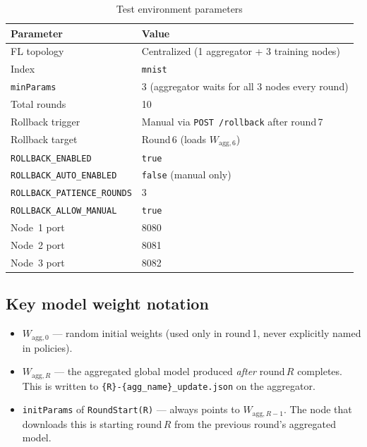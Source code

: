\documentclass[11pt,a4paper]{article}
\newcommand{\Wagg}[1]{$W_{\text{agg},#1}$}
\begin{document}
\begin{table}[H]
\centering
\caption{Test environment parameters}
\begin{tabular}{ll}
\toprule
\textbf{Parameter} & \textbf{Value} \\
\midrule
FL topology       & Centralized (1 aggregator + 3 training nodes) \\
Index             & \texttt{mnist} \\
\texttt{minParams} & 3 (aggregator waits for all 3 nodes every round) \\
Total rounds      & 10 \\
Rollback trigger  & Manual via \texttt{POST /rollback} after round\,7 \\
Rollback target   & Round\,6 (loads \Wagg{6}) \\
\texttt{ROLLBACK\_ENABLED} & \texttt{true} \\
\texttt{ROLLBACK\_AUTO\_ENABLED} & \texttt{false} (manual only) \\
\texttt{ROLLBACK\_PATIENCE\_ROUNDS} & 3 \\
\texttt{ROLLBACK\_ALLOW\_MANUAL} & \texttt{true} \\
Node~1 port       & 8080 \\
Node~2 port       & 8081 \\
Node~3 port       & 8082 \\
\bottomrule
\end{tabular}
\end{table}

\subsection{Key model weight notation}

\begin{itemize}[nosep]
  \item \Wagg{0} --- random initial weights (used only in round\,1, never
        explicitly named in policies).
  \item \Wagg{R} --- the aggregated global model produced \emph{after}
        round\,$R$ completes.  This is written to
        \texttt{\{R\}-\{agg\_name\}\_update.json} on the aggregator.
  \item \texttt{initParams} of \texttt{RoundStart(R)} --- always points to
        \Wagg{R-1}.  The node that downloads this is starting round\,$R$
        from the previous round's aggregated model.
\end{itemize}
\end{document}

